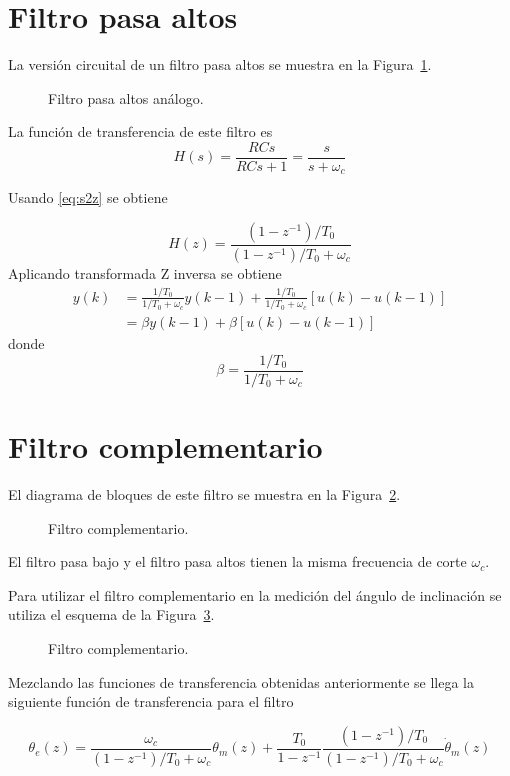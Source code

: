 \documentclass[11pt]{article} %
\begin{document}
\section{Filtro pasa altos}
La versión circuital de un filtro pasa altos se muestra en la Figura~\ref{fig:HPF}.

\begin{figure}[h!tb]
\centering

\caption{Filtro pasa altos análogo.}
\label{fig:HPF}
\end{figure}

La función de transferencia de este filtro es
\[ H(s) = \frac{RCs}{RCs+1} = \frac{s}{s+\omega_c} \]

Usando \eqref{eq:s2z} se obtiene

\[ H(z) = \frac{(1-z^{-1})/T_0}{(1-z^{-1})/T_0 + \omega_c} \]
Aplicando transformada Z inversa se obtiene
\begin{align*}
y(k) &= \frac{1/T_0}{1/T_0+\omega_c} y(k-1) + \frac{1/T_0}{1/T_0+\omega_c} [u(k)-u(k-1)]  \\
	&= \beta y(k-1) + \beta [u(k)-u(k-1)]
\end{align*}
donde
\[ \beta = \frac{1/T_0}{1/T_0+\omega_c} \]

\section{Filtro complementario}
El diagrama de bloques de este filtro se muestra en la Figura~\ref{fig:CF}.

\begin{figure}[h!tb]
\centering

\caption{Filtro complementario.}
\label{fig:CF}
\end{figure}

El filtro pasa bajo y el filtro pasa altos tienen la misma 
frecuencia de corte \( \omega_c \).

Para utilizar el filtro complementario en la medición del 
ángulo de inclinación se utiliza el esquema de la 
Figura~\ref{fig:CFaccgyro}.

\begin{figure}[h!tb]
\centering

\caption{Filtro complementario.}
\label{fig:CFaccgyro}
\end{figure}

Mezclando las funciones de transferencia obtenidas 
 anteriormente se llega la siguiente función de transferencia 
para el filtro

\[ \theta_e(z) = \frac{\omega_c}{(1-z^{-1})/T_0 + \omega_c} \theta_m (z) + \frac{T_0}{1-z^{-1}} \frac{(1-z^{-1})/T_0}{(1-z^{-1})/T_0 + \omega_c} \dot{\theta}_m(z) \]
\end{document}
